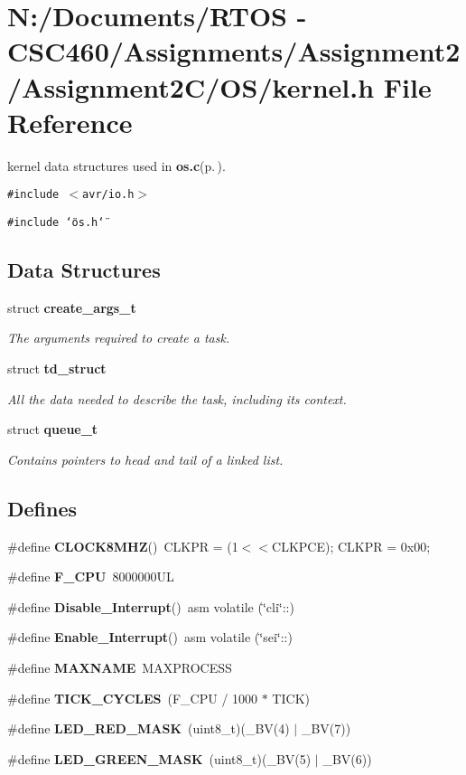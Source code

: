 \section{N:/Documents/RTOS - CSC460/Assignments/Assignment2/Assignment2C/OS/kernel.h File Reference}
\label{kernel_8h}
kernel data structures used in {\bf os.c}{\rm (p.\,\pageref{os_8c})}. 

{\tt \#include $<$avr/io.h$>$}\par
{\tt \#include \char`\"{}os.h\char`\"{}}\par
\subsection*{Data Structures}
\begin{CompactItemize}
\item 
struct {\bf create\_\-args\_\-t}
\begin{CompactList}\small\item\em The arguments required to create a task. \item\end{CompactList}\item 
struct {\bf td\_\-struct}
\begin{CompactList}\small\item\em All the data needed to describe the task, including its context. \item\end{CompactList}\item 
struct {\bf queue\_\-t}
\begin{CompactList}\small\item\em Contains pointers to head and tail of a linked list. \item\end{CompactList}\end{CompactItemize}
\subsection*{Defines}
\begin{CompactItemize}
\item 
\#define {\bf CLOCK8MHZ}()~CLKPR = (1$<$$<$CLKPCE); CLKPR = 0x00;
\item 
\#define {\bf F\_\-CPU}~8000000UL
\item 
\#define {\bf Disable\_\-Interrupt}()~asm volatile (\char`\"{}cli\char`\"{}::)
\item 
\#define {\bf Enable\_\-Interrupt}()~asm volatile (\char`\"{}sei\char`\"{}::)
\item 
\#define {\bf MAXNAME}~MAXPROCESS
\item 
\#define {\bf TICK\_\-CYCLES}~(F\_\-CPU / 1000 $\ast$ TICK)
\item 
\#define {\bf LED\_\-RED\_\-MASK}~(uint8\_\-t)(\_\-BV(4) $|$ \_\-BV(7))
\item 
\#define {\bf LED\_\-GREEN\_\-MASK}~(uint8\_\-t)(\_\-BV(5) $|$ \_\-BV(6))
\end{CompactItemize}

